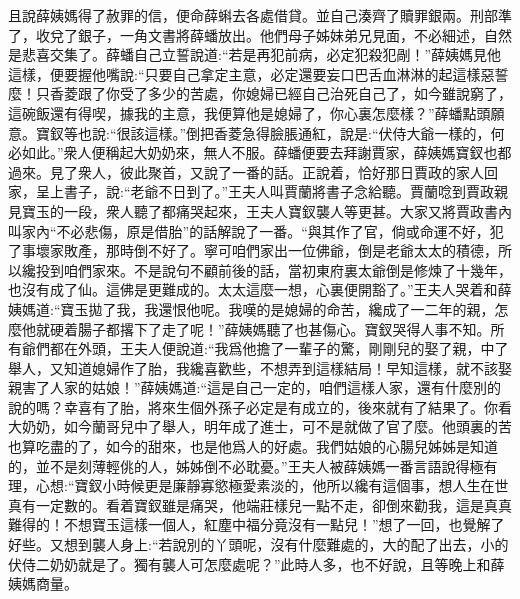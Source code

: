 \begin{parag}
    且說薛姨媽得了赦罪的信，便命薛蝌去各處借貸。並自己湊齊了贖罪銀兩。刑部準了，收兌了銀子，一角文書將薛蟠放出。他們母子姊妹弟兄見面，不必細述，自然是悲喜交集了。薛蟠自己立誓說道:“若是再犯前病，必定犯殺犯剮！”薛姨媽見他這樣，便要握他嘴說:“只要自己拿定主意，必定還要妄口巴舌血淋淋的起這樣惡誓麼！只香菱跟了你受了多少的苦處，你媳婦已經自己治死自己了，如今雖說窮了，這碗飯還有得喫，據我的主意，我便算他是媳婦了，你心裏怎麼樣？”薛蟠點頭願意。寶釵等也說:“很該這樣。”倒把香菱急得臉脹通紅，說是:“伏侍大爺一樣的，何必如此。”衆人便稱起大奶奶來，無人不服。薛蟠便要去拜謝賈家，薛姨媽寶釵也都過來。見了衆人，彼此聚首，又說了一番的話。正說着，恰好那日賈政的家人回家，呈上書子，說:“老爺不日到了。”王夫人叫賈蘭將書子念給聽。賈蘭唸到賈政親見寶玉的一段，衆人聽了都痛哭起來，王夫人寶釵襲人等更甚。大家又將賈政書內叫家內“不必悲傷，原是借胎”的話解說了一番。“與其作了官，倘或命運不好，犯了事壞家敗產，那時倒不好了。寧可咱們家出一位佛爺，倒是老爺太太的積德，所以纔投到咱們家來。不是說句不顧前後的話，當初東府裏太爺倒是修煉了十幾年，也沒有成了仙。這佛是更難成的。太太這麼一想，心裏便開豁了。”王夫人哭着和薛姨媽道:“寶玉拋了我，我還恨他呢。我嘆的是媳婦的命苦，纔成了一二年的親，怎麼他就硬着腸子都撂下了走了呢！”薛姨媽聽了也甚傷心。寶釵哭得人事不知。所有爺們都在外頭，王夫人便說道:“我爲他擔了一輩子的驚，剛剛兒的娶了親，中了舉人，又知道媳婦作了胎，我纔喜歡些，不想弄到這樣結局！早知這樣，就不該娶親害了人家的姑娘！”薛姨媽道:“這是自己一定的，咱們這樣人家，還有什麼別的說的嗎？幸喜有了胎，將來生個外孫子必定是有成立的，後來就有了結果了。你看大奶奶，如今蘭哥兒中了舉人，明年成了進士，可不是就做了官了麼。他頭裏的苦也算吃盡的了，如今的甜來，也是他爲人的好處。我們姑娘的心腸兒姊姊是知道的，並不是刻薄輕佻的人，姊姊倒不必耽憂。”王夫人被薛姨媽一番言語說得極有理，心想:“寶釵小時候更是廉靜寡慾極愛素淡的，他所以纔有這個事，想人生在世真有一定數的。看着寶釵雖是痛哭，他端莊樣兒一點不走，卻倒來勸我，這是真真難得的！不想寶玉這樣一個人，紅塵中福分竟沒有一點兒！”想了一回，也覺解了好些。又想到襲人身上:“若說別的丫頭呢，沒有什麼難處的，大的配了出去，小的伏侍二奶奶就是了。獨有襲人可怎麼處呢？”此時人多，也不好說，且等晚上和薛姨媽商量。
\end{parag}


